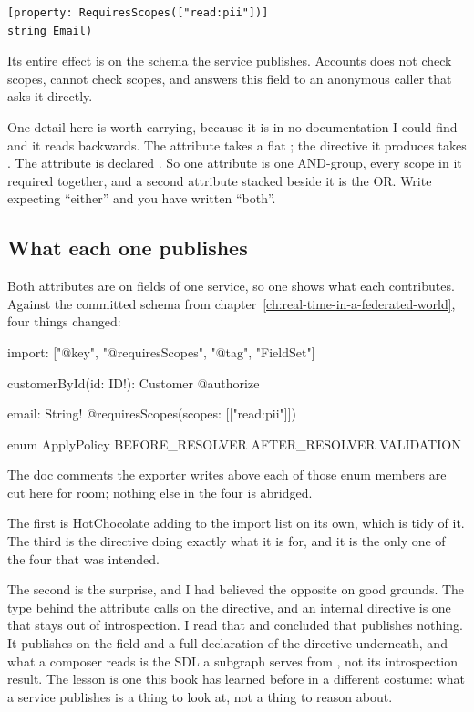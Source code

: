 \begin{verbatim}
[property: RequiresScopes(["read:pii"])]
string Email)
\end{verbatim}

Its entire effect is on the schema the service publishes. Accounts does not
check scopes, cannot check scopes, and answers this field to an anonymous
caller that asks it directly.

One detail here is worth carrying, because it is in no documentation I could
find and it reads backwards. The attribute takes a flat ; the
directive it produces takes \code{[[Scope!]!]!}. The attribute is declared
. So one attribute is one AND-group, every scope in
it required together, and a second attribute stacked beside it is the OR. Write
\code{[RequiresScopes(["a", "b"])]} expecting \enquote{either} and you have
written \enquote{both}.

\subsection*{What each one publishes}

%
Both attributes are on fields of one service, so one  shows
what each contributes. Against the committed schema from
chapter~\ref{ch:real-time-in-a-federated-world}, four things changed:

\begin{graphqlsdl}
import: ["@key", "@requiresScopes", "@tag", "FieldSet"]

customerById(id: ID!): Customer @authorize

email: String! @requiresScopes(scopes: [["read:pii"]])

enum ApplyPolicy {
  BEFORE_RESOLVER
  AFTER_RESOLVER
  VALIDATION
}
\end{graphqlsdl}

The doc comments the exporter writes above each of those enum members are cut
here for room; nothing else in the four is abridged.

The first is HotChocolate adding  to the 
import list on its own, which is tidy of it. The third is the directive doing
exactly what it is for, and it is the only one of the four that was intended.

The second is the surprise, and I had believed the opposite on good grounds.
The type behind the attribute calls  on the directive, and
an internal directive is one that stays out of introspection. I read that and
concluded that \code{[Authorize]} publishes nothing. It publishes
 on the field and a full declaration of the directive
underneath, and what a composer reads is the SDL a subgraph serves from
, not its introspection result. The lesson
is one this book has learned before in a different costume: what a service
publishes is a thing to look at, not a thing to reason about.

